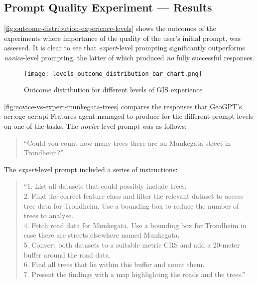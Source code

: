 \subsection{Prompt Quality Experiment --- Results}
\label{subsec:prompt-quality-test-results}

\autoref{fig:outcome-distribution-experience-levels} shows the outcomes of the experiments where importance of the quality of the user's initial prompt, was assessed. It is clear to see that \textit{expert}-level prompting significantly outperforms \textit{novice}-level prompting, the latter of which produced \textit{no} fully successful responses.

\begin{figure}[htbp]
    \centering
    \texttt{[image: levels\_outcome\_distribution\_bar\_chart.png]}
    \caption{Outcome distribution for different levels of GIS experience}
    \label{fig:outcome-distribution-experience-levels}
\end{figure}

\autoref{fig:novice-vs-expert-munkegata-trees} compares the responses that GeoGPT's \acrshort{acr:ogc} \acrshort{acr:api} Features agent managed to produce for the different prompt levels on one of the tasks. The \textit{novice}-level prompt was as follows:

\begin{quote}
    \enquote{Could you count how many trees there are on Munkegata street in Trondheim?}
\end{quote}

\noindent The \textit{expert}-level prompt included a series of instructions:

\begin{quote}
    \enquote{1. List all datasets that could possibly include trees. \\
        2. Find the correct feature class and filter the relevant dataset to access tree data for Trondheim. Use a bounding box to reduce the number of trees to analyse. \\
        4. Fetch road data for Munkegata. Use a bounding box for Trondheim in case there are streets elsewhere named Munkegata. \\
        5. Convert both datasets to a suitable metric CRS and add a 20-meter buffer around the road data. \\
        6. Find all trees that lie within this buffer and count them. \\
        7. Present the findings with a map highlighting the roads and the trees.}
\end{quote}

